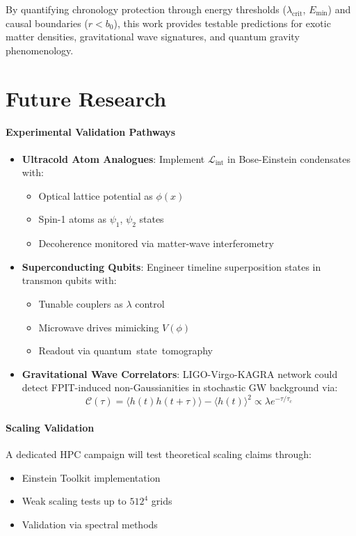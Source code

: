 \documentclass[twocolumn]{article}
\begin{document}
	By quantifying chronology protection through energy thresholds (\(\lambda_{\text{crit}}\), \(E_{\text{min}}\)) and causal boundaries (\(r < b_0\)), this work provides testable predictions for exotic matter densities, gravitational wave signatures, and quantum gravity phenomenology.
	
	\FloatBarrier%
	\section{Future Research}\label{sec:future}
	
	\paragraph{Experimental Validation Pathways}
	\begin{itemize}
		\item \textbf{Ultracold Atom Analogues}: Implement $\mathcal{L}_{\text{int}}$ in Bose-Einstein condensates with:
		\begin{itemize}
			\item Optical lattice potential as $\phi(x)$\cite{Gross2010}
			\item Spin-1 atoms as $\psi_1$, $\psi_2$ states  
			\item Decoherence monitored via matter-wave interferometry
		\end{itemize}
		
		\item \textbf{Superconducting Qubits}: Engineer timeline superposition states in transmon qubits with:  
		\begin{itemize}
			\item Tunable couplers as $\lambda$ control  
			\item Microwave drives mimicking $V(\phi)$  
			\item Readout via quantum~state~tomography
		\end{itemize}
		
		\item \textbf{Gravitational Wave Correlators}: LIGO-Virgo-KAGRA network could detect FPIT-induced non-Gaussianities in stochastic GW background via:  
		\begin{equation}
			\mathcal{C}(\tau) = \langle h(t)h(t+\tau)\rangle - \langle h(t)\rangle^2 \propto \lambda e^{-\tau/\tau_c}
		\end{equation}
	\end{itemize}
	
	\paragraph{Scaling Validation}
	A dedicated HPC campaign will test theoretical scaling claims through:  
	\begin{itemize}
		\item Einstein Toolkit\cite{Loffler2012} implementation  
		\item Weak scaling tests up to \(512^4\) grids  
		\item Validation via spectral methods\cite{Canuto2006}
	\end{itemize}
	
\end{document}
